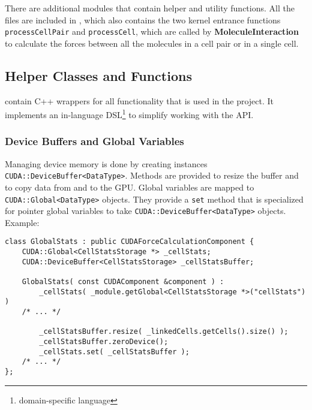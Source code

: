 
There are additional \cuda{} modules that contain helper and utility functions.
All the  files are included in , which also contains the two kernel entrance functions \lstinline!processCellPair! and \lstinline!processCell!, which are called by \textbf{MoleculeInteraction} to calculate the forces between all the molecules in a cell pair or in a single cell.

\subsection{\cuda{} Helper Classes and Functions}
 contain C++ wrappers for all \cuda{} functionality that is used in the project.
It implements an in-language DSL\footnote{domain-specific language} to simplify working with the \cuda{} API.


\subsubsection{Device Buffers and Global Variables}
Managing device memory is done by creating instances \lstinline!CUDA::DeviceBuffer<DataType>!. Methods are provided to resize the buffer and to copy data from and to the GPU.
Global variables are mapped to \lstinline!CUDA::Global<DataType>! objects. They provide a \lstinline!set! method that is specialized for pointer global variables to take \lstinline!CUDA::DeviceBuffer<DataType>! objects.
Example:
\begin{lstlisting}[label=cudamemoryhelpers,caption=CUDA helper classes for Device Memory and Globals]
class GlobalStats : public CUDAForceCalculationComponent {
	CUDA::Global<CellStatsStorage *> _cellStats;
	CUDA::DeviceBuffer<CellStatsStorage> _cellStatsBuffer;
	
	GlobalStats( const CUDAComponent &component ) :
		_cellStats( _module.getGlobal<CellStatsStorage *>("cellStats") )
	/* ... */
	
		_cellStatsBuffer.resize( _linkedCells.getCells().size() );
		_cellStatsBuffer.zeroDevice();
		_cellStats.set( _cellStatsBuffer );		
	/* ... */		
};	
\end{lstlisting}

